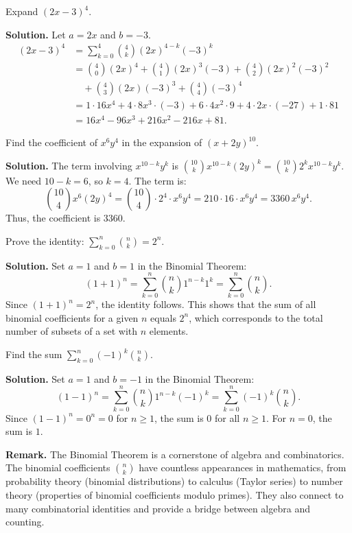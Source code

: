 \documentclass[11pt,a4paper]{article}
\begin{document}
\begin{example}
Expand $(2x - 3)^4$.

\textbf{Solution.} Let $a = 2x$ and $b = -3$.
\begin{align*}
    (2x - 3)^4 &= \sum_{k=0}^{4} \binom{4}{k} (2x)^{4-k} (-3)^k \\
    &= \binom{4}{0}(2x)^4 + \binom{4}{1}(2x)^3(-3) + \binom{4}{2}(2x)^2(-3)^2 \\
    &\quad + \binom{4}{3}(2x)(-3)^3 + \binom{4}{4}(-3)^4 \\
    &= 1 \cdot 16x^4 + 4 \cdot 8x^3 \cdot (-3) + 6 \cdot 4x^2 \cdot 9 + 4 \cdot 2x \cdot (-27) + 1 \cdot 81 \\
    &= 16x^4 - 96x^3 + 216x^2 - 216x + 81.
\end{align*}
\end{example}

\begin{example}
Find the coefficient of $x^6 y^4$ in the expansion of $(x + 2y)^{10}$.

\textbf{Solution.} The term involving $x^{10-k} y^k$ is $\binom{10}{k} x^{10-k} (2y)^k = \binom{10}{k} 2^k x^{10-k} y^k$. We need $10-k = 6$, so $k = 4$. The term is:
\begin{equation*}
    \binom{10}{4} x^{6} (2y)^4 = \binom{10}{4} \cdot 2^4 \cdot x^6 y^4 = 210 \cdot 16 \cdot x^6 y^4 = 3360 \, x^6 y^4.
\end{equation*}
Thus, the coefficient is $3360$.
\end{example}

\begin{example}
Prove the identity: $\displaystyle\sum_{k=0}^{n} \binom{n}{k} = 2^n$.

\textbf{Solution.} Set $a = 1$ and $b = 1$ in the Binomial Theorem:
\begin{equation*}
    (1 + 1)^n = \sum_{k=0}^{n} \binom{n}{k} 1^{n-k} 1^k = \sum_{k=0}^{n} \binom{n}{k}.
\end{equation*}
Since $(1+1)^n = 2^n$, the identity follows. This shows that the sum of all binomial coefficients for a given $n$ equals $2^n$, which corresponds to the total number of subsets of a set with $n$ elements.
\end{example}

\begin{example}
Find the sum $\displaystyle\sum_{k=0}^{n} (-1)^k \binom{n}{k}$.

\textbf{Solution.} Set $a = 1$ and $b = -1$ in the Binomial Theorem:
\begin{equation*}
    (1 - 1)^n = \sum_{k=0}^{n} \binom{n}{k} 1^{n-k} (-1)^k = \sum_{k=0}^{n} (-1)^k \binom{n}{k}.
\end{equation*}
Since $(1-1)^n = 0^n = 0$ for $n \geq 1$, the sum is $0$ for all $n \geq 1$. For $n = 0$, the sum is $1$.
\end{example}

\textbf{Remark.} The Binomial Theorem is a cornerstone of algebra and combinatorics. The binomial coefficients $\binom{n}{k}$ have countless appearances in mathematics, from probability theory (binomial distributions) to calculus (Taylor series) to number theory (properties of binomial coefficients modulo primes). They also connect to many combinatorial identities and provide a bridge between algebra and counting.
\end{document}
